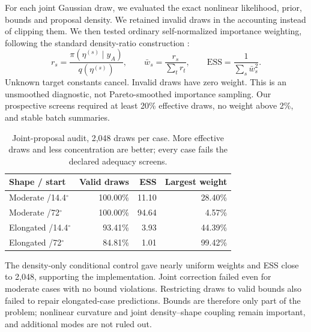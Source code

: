 \documentclass[11pt,a4paper]{article}
\newcommand{\degree}{\ensuremath{^{\circ}}}
\begin{document}
For each joint Gaussian draw, we evaluated the exact nonlinear likelihood, prior, bounds and proposal density. We retained invalid draws in the accounting instead of clipping them. We then tested ordinary self-normalized importance weighting, following the standard density-ratio construction \cite{psis}:
\begin{equation}
r_s=\frac{\pi(\eta^{(s)}\mid y_A)}{q(\eta^{(s)})},\qquad
\bar w_s=\frac{r_s}{\sum_t r_t},\qquad\mathrm{ESS}=\frac{1}{\sum_s\bar w_s^2}.\label{eq:importance}
\end{equation}
Unknown target constants cancel. Invalid draws have zero weight. This is an unsmoothed diagnostic, not Pareto-smoothed importance sampling. Our prospective screens required at least 20\% effective draws, no weight above 2\%, and stable batch summaries.
\begin{table}[H]\centering\small
\caption{Joint-proposal audit, 2,048 draws per case. More effective draws and less concentration are better; every case fails the declared adequacy screens.}
\begin{tabular}{lrrr}\toprule
Shape / start & Valid draws & ESS & Largest weight\\\midrule
Moderate /14.4\degree{} &100.00\%&11.10&28.40\%\\
Moderate /72\degree{} &100.00\%&94.64&4.57\%\\
Elongated /14.4\degree{} &93.41\%&3.93&44.39\%\\
Elongated /72\degree{} &84.81\%&1.01&99.42\%\\\bottomrule
\end{tabular}\end{table}
The density-only conditional control gave nearly uniform weights and ESS close to 2,048, supporting the implementation. Joint correction failed even for moderate cases with no bound violations. Restricting draws to valid bounds also failed to repair elongated-case predictions. Bounds are therefore only part of the problem; nonlinear curvature and joint density--shape coupling remain important, and additional modes are not ruled out.
\end{document}
